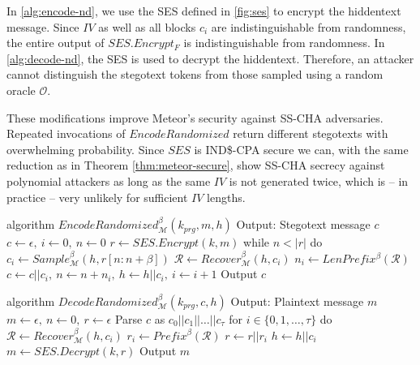 
In \autoref{alg:encode-nd}, we use the SES defined in \autoref{fig:ses} to encrypt the hiddentext message.
Since $IV$ as well as all blocks $c_i$ are indistinguishable from randomness, the entire output of $SES.Encrypt_F$ is indistinguishable from randomness.
In \autoref{alg:decode-nd}, the SES is used to decrypt the hiddentext.
Therefore, an attacker cannot distinguish the stegotext tokens from those sampled using a random oracle $\mathcal{O}$.

These modifications improve Meteor's security against SS-CHA adversaries.
Repeated invocations of $EncodeRandomized$ return different stegotexts with overwhelming probability.
Since $SES$ is IND\$-CPA secure we can, with the same reduction as in Theorem \ref{thm:meteor-secure}, show SS-CHA secrecy against polynomial attackers as long as the same $IV$ is not generated twice, which is -- in practice -- very unlikely for sufficient $IV$ lengths.


\begin{Pseudocode}[float, caption={
$EncodeRandomized$ algorithm.
This algorithm differs from the original $Encode$ algorithm by using $SES$ to encrypt the message.
The ciphertext (which is indistinguishable from randomness and indeterministic) is then used to sample from $\mathcal{M}$.
}, label={alg:encode-nd}]
algorithm $EncodeRandomized_{\mathcal{M}}^{\beta}(k_{prg}, m, h)$
  Output: Stegotext message $c$
  $c \leftarrow \epsilon,~ i \leftarrow 0,~ n \leftarrow 0$
  $r \leftarrow SES.Encrypt(k, m)$
  while $n < |r|$ do
    $c_i \leftarrow Sample_{\mathcal{M}}^\beta(h, r[n: n+\beta])$
    $\mathcal{R} \leftarrow Recover_{\mathcal{M}}^\beta(h, c_i)$
    $n_i \leftarrow LenPrefix^\beta(\mathcal{R})$
    $c \leftarrow c || c_i,~ n \leftarrow n+n_i,~ h \leftarrow h||c_i,~ i \leftarrow i + 1$
  Output $c$
\end{Pseudocode}
\begin{Pseudocode}[float, caption={
$DecodeRandomized$ algorithm.
This algorithm differs from the original $Decode$ algorithm by using $SES$ to decrypt the stegotext.
}, label={alg:decode-nd}]
algorithm $DecodeRandomized_{\mathcal{M}}^{\beta}(k_{prg}, c, h)$
  Output: Plaintext message $m$
  $m \leftarrow \epsilon,~ n \leftarrow 0,~ r \leftarrow \epsilon$
  Parse $c$ as $c_0 || c_1 || \dots || c_{\tau}$
  for $i \in \{ 0, 1, \dots, \tau \}$ do
    $\mathcal{R} \leftarrow Recover_{\mathcal{M}}^\beta(h, c_i)$
    $r_i \leftarrow Prefix^\beta(\mathcal{R})$
    $r \leftarrow r || r_i$
    $h \leftarrow h||c_i$
  $m \leftarrow SES.Decrypt(k, r)$
  Output $m$
\end{Pseudocode}